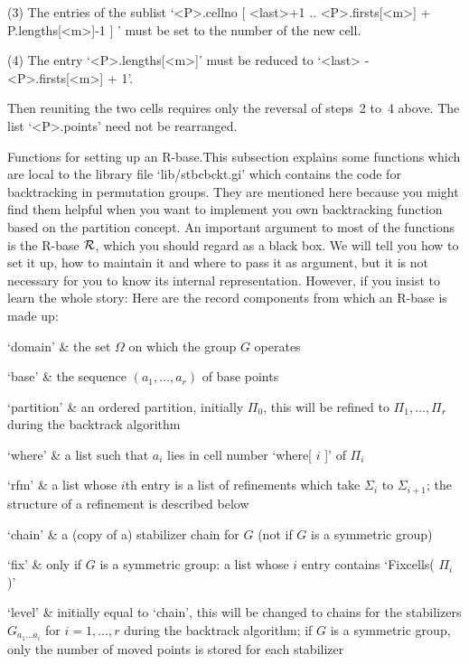 \item{(3)}
The entries of the sublist `<P>.cellno{ [ <last>+1 ..  <P>.firsts[<m>]  +
P.lengths[<m>]-1 ] }' must be set to the number of the new cell.

\item{(4)}
The entry `<P>.lengths[<m>]' must be reduced to `<last> - <P>.firsts[<m>]
+ 1'.

\endlist

Then reuniting the  two cells requires  only the reversal of steps~2 to~4
above. The list `<P>.points' need not be rearranged.

\medskip
{\bsf Functions for setting up  an R-base.}\quad This subsection explains
some  {\GAP}  functions   which   are   local   to   the   library   file
`lib/stbcbckt.gi' which contains the code for backtracking in permutation
groups. They are mentioned here because you might find them helpful  when
you want  to  implement  you  own  backtracking  function  based  on  the
partition concept. An important argument to most of the functions is  the
R-base ${\cal R}$, which you should regard as a black box. We will tell you how
to set it up, how to maintain it and where to pass it as argument, but it
is not necessary for you to know its internal representation. However, if
you insist to learn the whole story: Here are the record components  from
which an R-base is made up:

\beginitems
`domain' &
    the set $\Omega$ on which the group $G$ operates

`base' &
    the sequence $(a_1,\ldots,a_r)$ of base points

`partition' &
    an  ordered  partition, initially  $\Pi_0$, this  will be  refined to
    $\Pi_1,\ldots,\Pi_r$ during the backtrack algorithm

`where' &
    a list such that $a_i$ lies in cell number `where[ $i$ ]' of $\Pi_i$

`rfm' &
    a    list whose $i$th entry  is   a  list of   refinements which take
    $\Sigma_i$  to $\Sigma_{i+1}$;  the    structure of a  refinement  is
    described below

`chain' &
    a (copy of a) stabilizer  chain for $G$ (not  if  $G$ is a  symmetric
    group)

`fix' &
    only if  $G$ is a  symmetric group:  a list whose  $i$ entry contains
    `Fixcells( $\Pi_i$ )'

`level' &
    initially equal to `chain',  this will be changed  to chains  for the
    stabilizers  $G_{a_1\dots  a_i}$    for  $i=1,\ldots,r$  during   the
    backtrack algorithm; if $G$ is a  symmetric group, only the number of
    moved points is stored for each stabilizer

